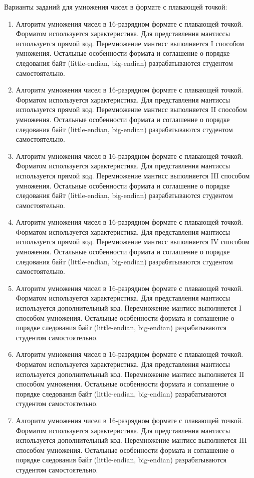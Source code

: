 Варианты заданий для умножения чисел в формате с плавающей точкой:
\begin{enumerate}
    \item Алгоритм умножения чисел в 16-разрядном формате с плавающей точкой. Форматом используется характеристика. Для представления мантиссы используется прямой код. Перемножение мантисс выполняется I способом умножения. Остальные особенности формата и соглашение о порядке следования байт (little-endian, big-endian) разрабатываются студентом самостоятельно.
    \item Алгоритм умножения чисел в 16-разрядном формате с плавающей точкой. Форматом используется характеристика. Для представления мантиссы используется прямой код. Перемножение мантисс выполняется II способом умножения. Остальные особенности формата и соглашение о порядке следования байт (little-endian, big-endian) разрабатываются студентом самостоятельно.
    \item Алгоритм умножения чисел в 16-разрядном формате с плавающей точкой. Форматом используется характеристика. Для представления мантиссы используется прямой код. Перемножение мантисс выполняется III способом умножения. Остальные особенности формата и соглашение о порядке следования байт (little-endian, big-endian) разрабатываются студентом самостоятельно.
    \item Алгоритм умножения чисел в 16-разрядном формате с плавающей точкой. Форматом используется характеристика. Для представления мантиссы используется прямой код. Перемножение мантисс выполняется IV способом умножения. Остальные особенности формата и соглашение о порядке следования байт (little-endian, big-endian) разрабатываются студентом самостоятельно.
    \item Алгоритм умножения чисел в 16-разрядном формате с плавающей точкой. Форматом используется характеристика. Для представления мантиссы используется дополнительный код. Перемножение мантисс выполняется I способом умножения. Остальные особенности формата и соглашение о порядке следования байт (little-endian, big-endian) разрабатываются студентом самостоятельно.
    \item Алгоритм умножения чисел в 16-разрядном формате с плавающей точкой. Форматом используется характеристика. Для представления мантиссы используется дополнительный код. Перемножение мантисс выполняется II способом умножения. Остальные особенности формата и соглашение о порядке следования байт (little-endian, big-endian) разрабатываются студентом самостоятельно.
    \item Алгоритм умножения чисел в 16-разрядном формате с плавающей точкой. Форматом используется характеристика. Для представления мантиссы используется дополнительный код. Перемножение мантисс выполняется III способом умножения. Остальные особенности формата и соглашение о порядке следования байт (little-endian, big-endian) разрабатываются студентом самостоятельно.

\end{enumerate}
